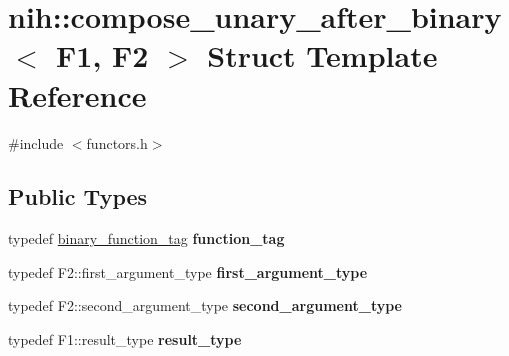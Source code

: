 \hypertarget{structnih_1_1compose__unary__after__binary}{
\section{nih\-:\-:compose\-\_\-unary\-\_\-after\-\_\-binary$<$ \-F1, \-F2 $>$ \-Struct \-Template \-Reference}
\label{structnih_1_1compose__unary__after__binary}
}


{\ttfamily \#include $<$functors.\-h$>$}

\subsection*{\-Public \-Types}
\begin{DoxyCompactItemize}
\item 
\hypertarget{structnih_1_1compose__unary__after__binary_ab62fa0de092a7cab9a834cf4864d761a}{
typedef \hyperlink{structnih_1_1binary__function__tag}{binary\-\_\-function\-\_\-tag} {\bfseries function\-\_\-tag}}
\label{structnih_1_1compose__unary__after__binary_ab62fa0de092a7cab9a834cf4864d761a}

\item 
\hypertarget{structnih_1_1compose__unary__after__binary_a478a79cf17d07c3bb60841aadc71eddb}{
typedef \-F2\-::first\-\_\-argument\-\_\-type {\bfseries first\-\_\-argument\-\_\-type}}
\label{structnih_1_1compose__unary__after__binary_a478a79cf17d07c3bb60841aadc71eddb}

\item 
\hypertarget{structnih_1_1compose__unary__after__binary_a4070c0d7ce319733c62b1332b173d17d}{
typedef \-F2\-::second\-\_\-argument\-\_\-type {\bfseries second\-\_\-argument\-\_\-type}}
\label{structnih_1_1compose__unary__after__binary_a4070c0d7ce319733c62b1332b173d17d}

\item 
\hypertarget{structnih_1_1compose__unary__after__binary_a0d563d8587331d789c35eab2d208bdee}{
typedef \-F1\-::result\-\_\-type {\bfseries result\-\_\-type}}
\label{structnih_1_1compose__unary__after__binary_a0d563d8587331d789c35eab2d208bdee}

\end{DoxyCompactItemize}
